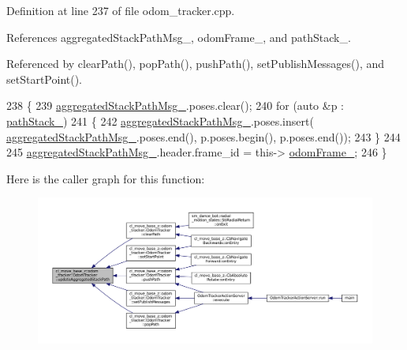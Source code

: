 Definition at line 237 of file odom\+\_\+tracker.\+cpp.



References aggregated\+Stack\+Path\+Msg\+\_\+, odom\+Frame\+\_\+, and path\+Stack\+\_\+.



Referenced by clear\+Path(), pop\+Path(), push\+Path(), set\+Publish\+Messages(), and set\+Start\+Point().


\begin{DoxyCode}
238 \{
239   \hyperlink{classcl__move__base__z_1_1odom__tracker_1_1OdomTracker_a0fb60113ace2791a1f1bbeed59946404}{aggregatedStackPathMsg\_}.poses.clear();
240   \textcolor{keywordflow}{for} (\textcolor{keyword}{auto} &p : \hyperlink{classcl__move__base__z_1_1odom__tracker_1_1OdomTracker_a1ccad1b568b6c65da43ba6639b6bd1ef}{pathStack\_})
241   \{
242     \hyperlink{classcl__move__base__z_1_1odom__tracker_1_1OdomTracker_a0fb60113ace2791a1f1bbeed59946404}{aggregatedStackPathMsg\_}.poses.insert(
      \hyperlink{classcl__move__base__z_1_1odom__tracker_1_1OdomTracker_a0fb60113ace2791a1f1bbeed59946404}{aggregatedStackPathMsg\_}.poses.end(), p.poses.begin(), p.poses.end());
243   \}
244 
245   \hyperlink{classcl__move__base__z_1_1odom__tracker_1_1OdomTracker_a0fb60113ace2791a1f1bbeed59946404}{aggregatedStackPathMsg\_}.header.frame\_id = this->
      \hyperlink{classcl__move__base__z_1_1odom__tracker_1_1OdomTracker_a54f31af5e74006560d94f266297853d4}{odomFrame\_};
246 \}
\end{DoxyCode}
Here is the caller graph for this function\+:
\nopagebreak
\begin{figure}[H]
\begin{center}
\leavevmode
\includegraphics[width=350pt]{classcl__move__base__z_1_1odom__tracker_1_1OdomTracker_a7922f1e1e688a2ed62d32d9914985a9f_icgraph}
\end{center}
\end{figure}
\mbox{\label{classcl__move__base__z_1_1odom__tracker_1_1OdomTracker_abe7ba4dbf014e1f2c64b5806ce42c073}} 
